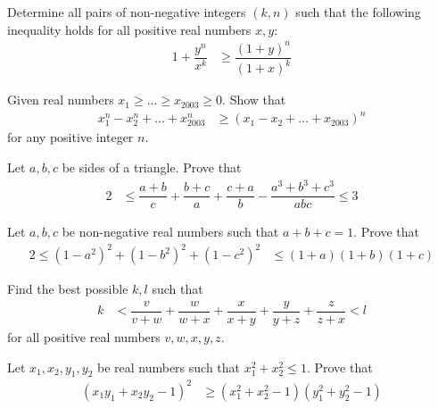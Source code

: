 \documentclass{subfile}
\begin{document}
		\begin{problem}%
			Determine all pairs of non-negative integers $(k,n)$ such that the following inequality holds for all positive real numbers $x,y$:
				\begin{align*}
					1+\dfrac{y^{n}}{x^{k}}
						& \geq\dfrac{(1+y)^{n}}{(1+x)^{k}}
				\end{align*}
		\end{problem}
	
		\begin{problem}
			Given real numbers $x_{1}\geq\ldots\geq x_{2003}\geq0$. Show that
				\begin{align*}
					x_{1}^{n}-x_{2}^{n}+\ldots+x_{2003}^{n}
						& \geq (x_{1}-x_{2}+\ldots+x_{2003})^{n}
				\end{align*}
			for any positive integer $n$.
		\end{problem}
	
		\begin{problem}
			Let $a,b,c$ be sides of a triangle. Prove that
				\begin{align*}
					2
						& \leq \dfrac{a+b}{c}+\dfrac{b+c}{a}+\dfrac{c+a}{b}-\dfrac{a^{3}+b^{3}+c^{3}}{abc}\leq3
				\end{align*}
		\end{problem}
	
		\begin{problem}
			Let $a,b,c$ be non-negative real numbers such that $a+b+c=1$. Prove that
				\begin{align*}
					2\leq(1-a^{2})^{2}+(1-b^{2})^{2}+(1-c^{2})^{2}
						& \leq (1+a)(1+b)(1+c)
				\end{align*}
		\end{problem}
	
		\begin{problem}
			Find the best possible $k,l$ such that
				\begin{align*}
					k
						& <\dfrac{v}{v+w}+\dfrac{w}{w+x}+\dfrac{x}{x+y}+\dfrac{y}{y+z}+\dfrac{z}{z+x}<l
				\end{align*}
			for all positive real numbers $v,w,x,y,z$.
		\end{problem}
	
		\begin{problem}
			Let $x_{1},x_{2},y_{1},y_{2}$ be real numbers such that $x_{1}^{2}+x_{2}^{2}\leq1$. Prove that
				\begin{align*}
					(x_{1}y_{1}+x_{2}y_{2}-1)^{2}
						& \geq(x_{1}^{2}+x_{2}^{2}-1)(y_{1}^{2}+y_{2}^{2}-1)
				\end{align*}
		\end{problem}
	
\end{document}
